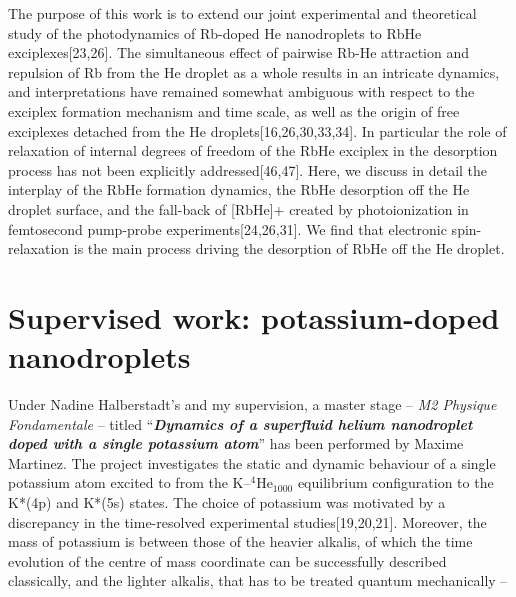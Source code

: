 		The purpose of this work is to extend our joint experimental and theoretical study of the photodynamics of Rb-doped He nanodroplets to RbHe exciplexes[23,26]. The simultaneous effect of pairwise Rb-He attraction and repulsion of Rb from the He droplet as a whole results in an intricate dynamics, and interpretations have remained somewhat ambiguous with respect to the exciplex formation mechanism and time scale, as well as the origin of free exciplexes detached from the He droplets[16,26,30,33,34]. In particular the role of relaxation of internal degrees of freedom of the RbHe exciplex in the desorption process has not been explicitly addressed[46,47]. Here, we discuss in detail the interplay of the RbHe formation dynamics, the RbHe desorption off the He droplet surface, and the fall-back of [RbHe]+ created by photoionization in femtosecond pump-probe experiments[24,26,31]. We find that electronic spin-relaxation is the main process driving the desorption of RbHe off the He droplet.
		
	\section{Supervised work: potassium-doped nanodroplets}
		Under Nadine Halberstadt's and my supervision, a master stage -- \emph{M2 Physique Fondamentale} -- titled ``\emph{\textbf{Dynamics of a superfluid helium nanodroplet doped with a single potassium atom}}'' has been performed by Maxime Martinez. The project investigates the static and dynamic behaviour of a single potassium atom excited to from the K--$^4$He$_{1000}$ equilibrium configuration  to the K*(4p) and K*(5s) states. The choice of potassium was motivated by a discrepancy in the time-resolved experimental studies[19,20,21]. Moreover, the mass of potassium is between those of the heavier alkalis, of which the time evolution of the centre of mass coordinate can be successfully described classically, and the lighter alkalis, that has to be treated quantum mechanically -- \citep{Martinez2017}